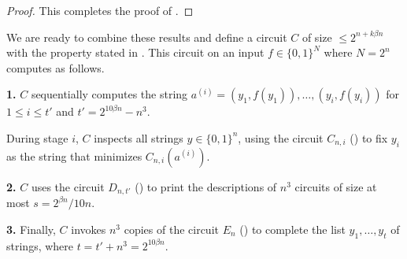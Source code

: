 \documentclass{toc}
\begin{document}
\begin{proof}
This completes the proof of .
\end{proof}




We are ready to combine these results and define a circuit $C$ of size $\leq 2^{n + k \beta n}$ with the property stated in . This circuit on an input $f \in \{0,1\}^N$ where $N = 2^n$ computes as follows.

\vspace{0.4cm}

\noindent \textbf{1.} $C$ sequentially computes the string $a^{(i)} = (y_1, f(y_1)), \ldots, (y_i,f(y_i))$ for $1 \leq i \leq t'$ and $t' = 2^{10 \beta n} - n^3$.

\vspace{0.2cm}

During stage $i$, $C$ inspects all strings $y \in \{0,1\}^n$, using the circuit $C_{n,i}$ () to fix $y_i$ as the string that minimizes $C_{n,i}(a^{(i)})$.

\vspace{0.3cm}

\noindent \textbf{2.} $C$ uses the circuit $D_{n,t'}$ () to print the descriptions of $n^3$ circuits of size at most $s =  2^{\beta n}/10n$.

\vspace{0.3cm}

\noindent \textbf{3.} Finally, $C$ invokes $n^3$ copies of the circuit $E_n$ () to complete the list $y_1, \ldots, y_t$ of strings, where $t = t' + n^3 = 2^{10 \beta n}$.\\
\end{document}
